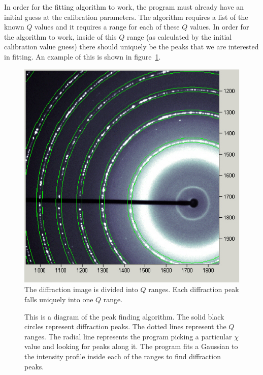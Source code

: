 In order for the fitting algorithm to work, the program 
must already have an initial guess at the calibration 
parameters. The algorithm requires 
a list of the known $Q$ values and it requires 
a range for each of these $Q$ values. In order for the 
algorithm to work, inside of this $Q$ range (as 
calculated by the initial calibration value guess) there 
should uniquely be the peaks that we are interested in fitting.
An example of this is shown in figure~\ref{divide_up_image}.

\begin{figure}
    \centering
    \includegraphics[scale=.75]
    {figures/constant_dq_lines_on_diffraction_image.eps}
    \caption{The diffraction image is divided into
    $Q$ ranges. Each diffraction peak falls
    uniquely into one $Q$ range.}
    \label{divide_up_image}
\end{figure}

\begin{figure}
    \centering
    
    \caption{This is a diagram of the peak finding algorithm. 
    The solid black circles represent diffraction peaks. The 
    dotted lines represent the $Q$ ranges. The radial line
    represents the program picking a 
    particular $\chi$ value and looking for peaks along it.
    The program fits a Gaussian to the intensity 
    profile inside each of the ranges to find diffraction 
    peaks.}
    \label{fitting}
\end{figure}

